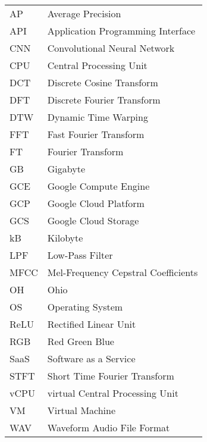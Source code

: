 \begingroup
\renewcommand{\arraystretch}{1.2}
\begin{tabular}{@{}p{2.5cm} l}
    AP	 &	Average Precision	\\
    API	 &	Application Programming Interface	\\
    CNN	 &	Convolutional Neural Network	\\
    CPU	 &	Central Processing Unit	\\
    DCT	 &	Discrete Cosine Transform	\\
    DFT	 &	Discrete Fourier Transform	\\
    DTW	 &	Dynamic Time Warping	\\
    FFT	 &	Fast Fourier Transform	\\
    FT	 &	Fourier Transform	\\
    GB	 &	Gigabyte	\\
    GCE	 &	Google Compute Engine	\\
    GCP	 &	Google Cloud Platform	\\
    GCS	 &	Google Cloud Storage	\\
    kB	 &	Kilobyte	\\
    LPF	 &	Low-Pass Filter	\\
    MFCC &	Mel-Frequency Cepstral Coefficients	\\
    OH	 &	Ohio	\\
    OS	 &	Operating System	\\
    ReLU &  Rectified Linear Unit \\
    RGB	 &	Red Green Blue	\\
    SaaS &	Software as a Service	\\
    STFT &	Short Time Fourier Transform	\\
    vCPU &	virtual Central Processing Unit	\\
    VM	 &	Virtual Machine	\\
    WAV	 &	Waveform Audio File Format	\\
\end{tabular}
\endgroup
